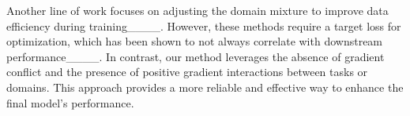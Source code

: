 Another line of work focuses on adjusting the domain mixture to improve data efficiency during training____. However, these methods require a target loss for optimization, which has been shown to not always correlate with downstream performance____. In contrast, our method leverages the absence of gradient conflict and the presence of positive gradient interactions between tasks or domains. This approach provides a more reliable and effective way to enhance the final model's performance.